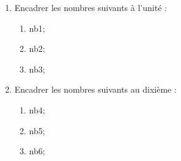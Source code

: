 \documentclass[exercice]{thedocument}%
\begin{document}
%
\begin{enumerate}
    \item Encadrer les nombres suivants à l'unité :
    \begin{enumerate}
        \item \<nb1;
        \item \<nb2;
        \item \<nb3;
    \end{enumerate}
    \item Encadrer les nombres suivants au dixième :
    \begin{enumerate}
        \item \<nb4;
        \item \<nb5;
        \item \<nb6;
    \end{enumerate}
\end{enumerate}
\end{document}

